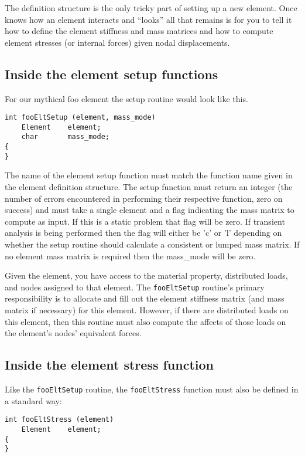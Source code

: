 The definition structure is the only tricky part of setting up a new element.
Once \felt{} knows how an element interacts and ``looks'' all that remains is
for you to tell it how to define the element stiffness and
mass matrices and how to 
compute element stresses (or internal forces) given nodal displacements.  

\subsection{Inside the element setup functions}

For our mythical foo element the setup routine would look like this.
\begin{screen}
 \begin{verbatim}
int fooEltSetup (element, mass_mode)   
    Element    element;
    char       mass_mode;
{
}
 \end{verbatim}
\end{screen}

The name of the element setup function must match the function name given
in the element definition structure.  
The setup function must return an integer (the number of errors encountered
in performing their respective function, zero on success) and must take
a single element and a flag indicating the mass matrix to compute as input.
If this is a static problem that flag will be zero.  If transient analysis
is being performed then the flag will either be 'c' or 'l' depending on
whether the setup routine should calculate a consistent or lumped mass
matrix. If no element mass matrix is required then the mass\_mode will be zero.

Given the element, you have access to the material property, distributed loads,
and nodes assigned to that element.  The {\tt fooEltSetup}
 routine's primary
responsibility is to allocate and fill out the element stiffness matrix
(and mass matrix if necessary) for this element.  However, if there are 
distributed loads on this element,
then this routine must also compute the affects of those loads on the element's
nodes' equivalent forces.

\subsection{Inside the element stress function}

Like the {\tt fooEltSetup} routine, the {\tt fooEltStress} function
must also be defined in a standard way:
\begin{screen}
 \begin{verbatim}
int fooEltStress (element)      
    Element    element;
{
}
 \end{verbatim}
\end{screen}

